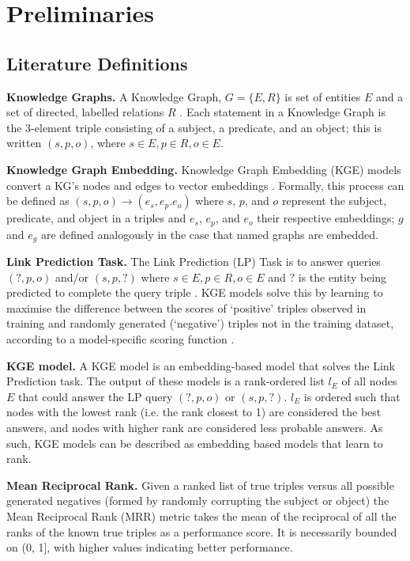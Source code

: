 \section{Preliminaries}
\subsection{Literature Definitions}
\textbf{Knowledge Graphs.} A Knowledge Graph, $G = \{E, R\}$ is set of entities $E$ and a set of directed, labelled relations $R$ \cite{kg-ovewview}. Each statement in a Knowledge Graph is the 3-element triple consisting of a subject, a predicate, and an object; this is written $(s, p, o)$, where $s \in E, p \in R, o \in E$.

\textbf{Knowledge Graph Embedding.} Knowledge Graph Embedding (KGE) models convert a KG's nodes and edges to vector embeddings \cite{rml-review,kge-survey,kge-completion-rev,kg-ovewview}. Formally, this process can be defined as $(s, p, o) \rightarrow (e_s, e_p. e_o)$ where $s$, $p$, and $o$ represent the subject, predicate, and object in a triples and $e_s$, $e_p$, and $e_o$ their respective embeddings; $g$ and $e_g$ are defined analogously in the case that named graphs are embedded.

\textbf{Link Prediction Task.} The Link Prediction (LP) Task is to answer queries $(?, p, o)$ and/or $(s, p, ?)$ where $s \in E, p \in R, o \in E$ and $?$ is the entity being predicted to complete the query triple \cite{rml-review,kge-survey,kge-completion-rev,kg-ovewview}. KGE models solve this by learning to maximise the difference between the scores of `positive' triples observed in training and randomly generated (`negative') triples not in the training dataset, according to a model-specific scoring function \cite{kge-survey,rml-review,kge-completion-rev,neg-samp-analysis}.

\textbf{KGE model.} A KGE model is an embedding-based model that solves the Link Prediction task. The output of these models is a rank-ordered list $l_E$ of all nodes $E$ that could answer the LP query $(?, p, o)$ or $(s, p, ?)$. $l_E$ is ordered such that nodes with the lowest rank (i.e. the rank closest to 1) are considered the best answers, and nodes with higher rank are considered less probable answers. As such, KGE models can be described as embedding based models that learn to rank.

\textbf{Mean Reciprocal Rank.} Given a ranked list of true triples versus all possible generated negatives (formed by randomly corrupting the subject or object) the Mean Reciprocal Rank (MRR) metric takes the mean of the reciprocal of all the ranks of the known true triples as a performance score. It is necessarily bounded on (0, 1], with higher values indicating better performance.

